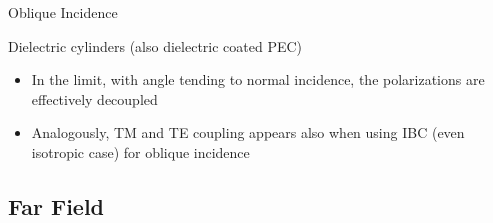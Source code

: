 \begin{frame}[allowframebreaks]{Oblique Incidence}
\begin{block}{Dielectric cylinders (also dielectric coated PEC)}
\begin{itemize}
   \item In the limit, with angle tending to normal incidence, the
     polarizations are effectively decoupled

   \item Analogously, TM and TE coupling appears also when using IBC (even
     isotropic case) for oblique incidence

     \end{itemize}
   \end{block}

  
\end{frame}
  

\subsection{Far Field}

